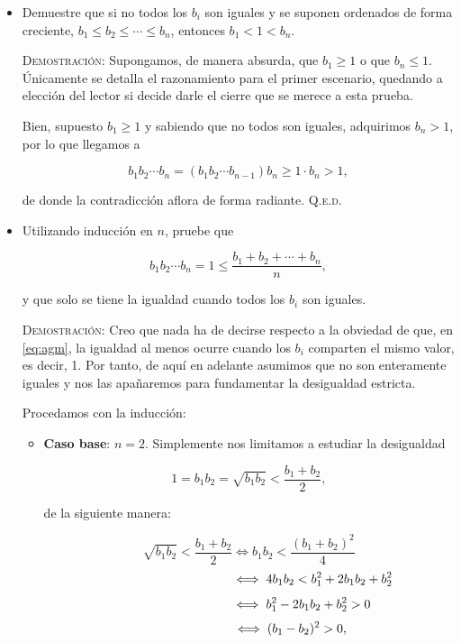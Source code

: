 \documentclass{article}
\begin{document}
\begin{itemize}
    \item[$a)$] Demuestre que si no todos los $b_i$ son iguales y se suponen ordenados de forma creciente,
    $b_1 \leq b_2 \leq \cdots \leq b_n$, entonces $b_1 < 1 < b_n$.

    \vspace{7px}

    \textsc{Demostración}: Supongamos, de manera absurda, que $b_1 \geq 1$ o que $b_n \leq 1$. Únicamente se detalla el razonamiento para el primer escenario, quedando a elección del lector si decide darle el cierre que se merece a esta prueba.

    Bien, supuesto $b_1 \geq 1$ y sabiendo que no todos son iguales, adquirimos $b_n > 1$, por lo que llegamos a

    \[b_1b_2 \cdots b_n = (b_1b_2 \cdots b_{n-1})b_n \geq 1 \cdot b_n > 1,\]

    de donde la contradicción aflora de forma radiante. \hfill{\textsc{Q.e.d.}}

    \item[$b)$] Utilizando inducción en $n$, pruebe que
    
    \begin{equation}
        b_1b_2 \cdots b_n = 1 \leq \frac{b_1 + b_2 + \cdots + b_n}{n},
        \label{eq:agm}
    \end{equation}

    y que solo se tiene la igualdad cuando todos los $b_i$ son iguales.

    \vspace{7px}

    \textsc{Demostración}: Creo que nada ha de decirse respecto a la obviedad de que, en \eqref{eq:agm}, la igualdad al menos ocurre cuando los $b_i$ comparten el mismo valor, es decir, 1.
    Por tanto, de aquí en adelante asumimos que no son enteramente iguales y nos las apañaremos para fundamentar la desigualdad estricta.

    Procedamos con la inducción:

    \begin{itemize}
        \item \textbf{Caso base}: $n = 2$. Simplemente nos limitamos a estudiar la desigualdad
        
        \[1 = b_1b_2 = \sqrt{b_1b_2} < \frac{b_1 + b_2}{2},\]

        de la siguiente manera:

        \[\sqrt{b_1b_2} < \frac{b_1 + b_2}{2} \iff b_1b_2 < \frac{(b_1 + b_2)^2}{4}\]
        \[\hspace{100px} \iff 4b_1b_2 < b_1^2 + 2b_1b_2 + b_2^2\]
        \[\hspace{83px}\iff b_1^2 - 2b_1b_2 + b_2^2 > 0\]
        \[\hspace{65px}\iff (b_1 - b_2)^2 > 0,\]


\end{itemize}
\end{itemize}
\end{document}
